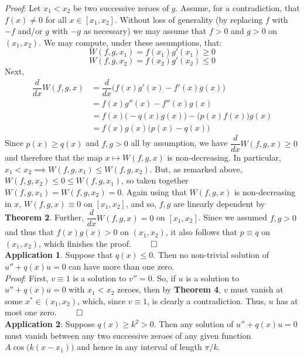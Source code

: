 \documentclass[12pt]{article}
\begin{document}
\noindent \textit{Proof}: Let $x_1 < x_2$ be two successive zeroes of $g$. Assume, for a contradiction, that $f(x) \not= 0$ for all $x \in [x_1, x_2]$. Without loss of generality (by replacing $f$ with $-f$ and/or $g$ with $-g$ as necessary) we may assume that $f > 0$ and $g > 0$ on $(x_1, x_2)$. We may compute, under these assumptions, that: $$W(f, g, x_1) = f(x_1)g'(x_1) \geq 0$$ $$W(f, g, x_2) = f(x_2) g'(x_2) \leq 0$$ Next, \begin{align*}
    \dfrac{d}{dx} W(f, g, x) &= \dfrac{d}{dx} \Big(f(x)g'(x) - f'(x)g(x) \Big) \\
    &= f(x)g''(x) - f''(x)g(x) \\
    &= f(x) \big(-q(x) g(x) \big) - \big(p(x) f(x) \big) g(x) \\
    &= f(x) g(x) \Big( p(x) - q(x) \Big)
\end{align*} Since $p(x) \geq q(x)$ and $f, g > 0$ all by assumption, we have $\dfrac{d}{dx}W(f, g, x) \geq 0$ and therefore that the map $x \mapsto W(f, g, x)$ is non-decreasing. In particular, $x_1 < x_2 \implies W(f, g, x_1) \leq W(f, g, x_2)$. But, as remarked above, $W(f, g, x_2) \leq 0 \leq W(f, g, x_1)$, so taken together $W(f, g, x_1) = W(f, g, x_2) = 0$. Again using that $W(f, g, x)$ is non-decreasing in $x$, $W(f, g, x) \equiv 0$ on $[x_1, x_2]$, and so, $f, g$ are linearly dependent by \textbf{Theorem 2}. Further, $\dfrac{d}{dx} W(f, g, x) = 0$ on $[x_1, x_2]$. Since we assumed $f, g > 0$ and thus that $f(x)g(x) > 0$ on $(x_1, x_2)$, it also follows that $p \equiv q$ on $(x_1, x_2)$, which finishes the proof. $\qed$ \\

\noindent \textbf{Application 1}. Suppose that $q(x) \leq 0$. Then no non-trivial solution of $u'' + q(x)u = 0$ can have more than one zero. \\

\noindent \textit{Proof}: First, $v \equiv 1$ is a solution to $v'' = 0$. So, if $u$ is a solution to $u'' + q(x)u = 0$ with $x_1 < x_2$ zeroes, then by \textbf{Theorem 4}, $v$ must vanish at some $x^* \in (x_1, x_2)$, which, since $v \equiv 1$, is clearly a contradiction. Thus, $u$ has at most one zero. $\qed$ \\

\noindent \textbf{Application 2}: Suppose $q(x) \geq k^2 > 0$. Then any solution of $u'' + q(x)u = 0$ must vanish between any two successive zeroes of any given function $A \cos \big( k(x - x_1) \big)$ and hence in any interval of length $\pi/k$. \\
\end{document}
